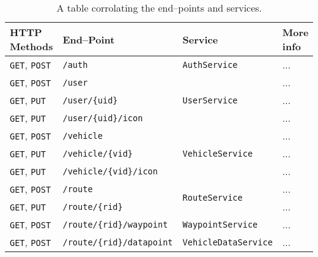 \begin{table}[ht]
    \centering
    \small
    \setlength\extrarowheight{1pt}
    \begin{tabularx}{0.9\textwidth}{l p{13em} l l}
        \textbf{HTTP Methods}       & \textbf{End--Point}               & \textbf{Service}             & \textbf{More info}  \\ \hline
        \texttt{GET}, \texttt{POST} & \texttt{/auth}                    & \texttt{AuthService}         & ... \\ \tblgrpsep
        \texttt{GET}, \texttt{POST} & \texttt{/user}                    & \multirow{3}{*}{\texttt{UserService}}         & ... \\
        \texttt{GET}, \texttt{PUT}  & \texttt{/user/\{uid\}}            &          & ... \\
        \texttt{GET}, \texttt{PUT}  & \texttt{/user/\{uid\}/icon}       &          & ... \\ \tblgrpsep

        \texttt{GET}, \texttt{POST} & \texttt{/vehicle}                 & \multirow{3}{*}{\texttt{VehicleService}}      & ... \\
        \texttt{GET}, \texttt{PUT}  & \texttt{/vehicle/\{vid\}}         &       & ... \\
        \texttt{GET}, \texttt{PUT}  & \texttt{/vehicle/\{vid\}/icon}    &       & ... \\ \tblgrpsep

        \texttt{GET}, \texttt{POST} & \texttt{/route}                   & \multirow{2}{*}{\texttt{RouteService}}        & ... \\
        \texttt{GET}, \texttt{PUT}  & \texttt{/route/\{rid\}}           &        & ... \\
        \texttt{GET}, \texttt{POST} & \texttt{/route/\{rid\}/waypoint}  & \texttt{WaypointService}     & ... \\
        \texttt{GET}, \texttt{POST} & \texttt{/route/\{rid\}/datapoint} & \texttt{VehicleDataService}  & ... \\ 
    \end{tabularx}
    \caption{A table corrolating the end--points and services.}\label{table:endpointservice}
\end{table}
